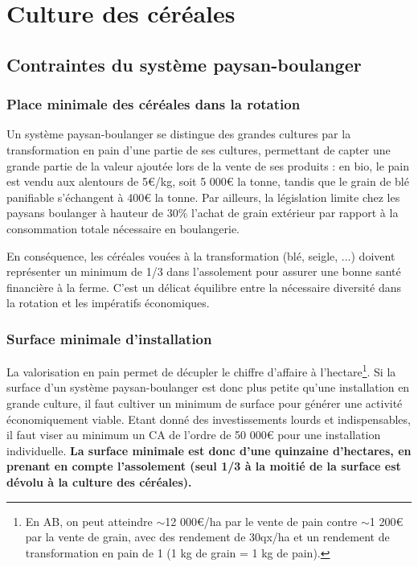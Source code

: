 \documentclass{book}
\begin{document}
\chapter{Culture des céréales}
\label{chap:cereales}

\section{Contraintes du système paysan-boulanger}

\subsection{Place minimale des céréales dans la rotation}

Un système paysan-boulanger se distingue des grandes cultures par la transformation en pain d'une partie de ses cultures, permettant de capter une grande partie de la valeur ajoutée lors de la vente de ses produits : en bio, le pain est vendu aux alentours de 5\euro{}/kg, soit 5 000\euro{} la tonne, tandis que le grain de blé panifiable s'échangent à 400\euro{} la tonne. Par ailleurs, la législation limite chez les paysans boulanger à hauteur de 30\% l'achat de grain extérieur par rapport à la consommation totale nécessaire en boulangerie. 

En conséquence, les céréales vouées à la transformation (blé, seigle, ...) doivent représenter un minimum de 1/3 dans l'assolement pour assurer une bonne santé financière à la ferme. C'est un délicat équilibre entre la nécessaire diversité dans la rotation et les impératifs économiques.

\subsection{Surface minimale d'installation}

La valorisation en pain permet de décupler le chiffre d'affaire à l'hectare\footnote{En AB, on peut atteindre $\sim$12 000\euro{}/ha par le vente de pain contre $\sim$1 200\euro{} par la vente de grain, avec des rendement de 30qx/ha et un rendement de transformation en pain de 1 (1 kg de grain = 1 kg de pain).}. Si la surface d'un système paysan-boulanger est donc plus petite qu'une installation en grande culture, il faut cultiver un minimum de surface pour générer une activité économiquement viable. Etant donné des investissements lourds et indispensables, il faut viser au minimum un CA de l'ordre de 50 000\euro{} pour une installation individuelle. \textbf{La surface minimale est donc d'une quinzaine d'hectares, en prenant en compte l'assolement (seul 1/3 à la moitié de la surface est dévolu à la culture des céréales).} 
\end{document}
